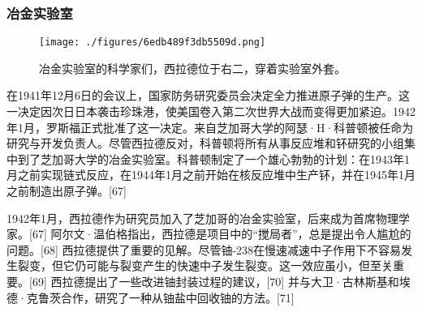\subsubsection{冶金实验室}
\begin{figure}[ht]
\centering
\texttt{[image: ./figures/6edb489f3db5509d.png]}
\caption{冶金实验室的科学家们，西拉德位于右二，穿着实验室外套。} \label{fig_Szilar_5}
\end{figure}
在1941年12月6日的会议上，国家防务研究委员会决定全力推进原子弹的生产。这一决定因次日日本袭击珍珠港，使美国卷入第二次世界大战而变得更加紧迫。1942年1月，罗斯福正式批准了这一决定。来自芝加哥大学的阿瑟·H·科普顿被任命为研究与开发负责人。尽管西拉德反对，科普顿将所有从事反应堆和钚研究的小组集中到了芝加哥大学的冶金实验室。科普顿制定了一个雄心勃勃的计划：在1943年1月之前实现链式反应，在1944年1月之前开始在核反应堆中生产钚，并在1945年1月之前制造出原子弹。[67]

1942年1月，西拉德作为研究员加入了芝加哥的冶金实验室，后来成为首席物理学家。[67] 阿尔文·温伯格指出，西拉德是项目中的“搅局者”，总是提出令人尴尬的问题。[68] 西拉德提供了重要的见解。尽管铀-238在慢速减速中子作用下不容易发生裂变，但它仍可能与裂变产生的快速中子发生裂变。这一效应虽小，但至关重要。[69] 西拉德提出了一些改进铀封装过程的建议，[70] 并与大卫·古林斯基和埃德·克鲁茨合作，研究了一种从铀盐中回收铀的方法。[71]